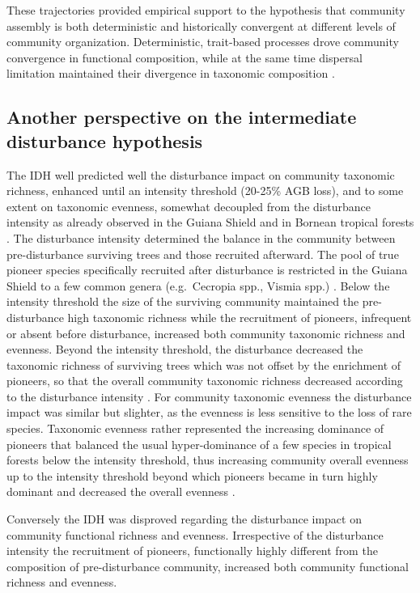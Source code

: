 \documentclass[fleqn,10pt]{ArtEcoFoG} %
\begin{document}
These trajectories provided empirical support to the hypothesis that
community assembly is both deterministic and historically convergent at
different levels of community organization. Deterministic, trait-based
processes drove community convergence in functional composition, while
at the same time dispersal limitation maintained their divergence in
taxonomic composition \citep{Fukami2005}.

\subsection{Another perspective on the intermediate disturbance
hypothesis}\label{another-perspective-on-the-intermediate-disturbance-hypothesis}

The IDH well predicted well the disturbance impact on community
taxonomic richness, enhanced until an intensity threshold (20-25\% AGB
loss), and to some extent on taxonomic evenness, somewhat decoupled from
the disturbance intensity as already observed in the Guiana Shield
\citep{Baraloto2012a} and in Bornean tropical forests
\citep{Cannon1998}. The disturbance intensity determined the balance in
the community between pre-disturbance surviving trees and those
recruited afterward. The pool of true pioneer species specifically
recruited after disturbance is restricted in the Guiana Shield to a few
common genera (e.g.~Cecropia spp., Vismia spp.) \citep{Guitet2018}.
Below the intensity threshold the size of the surviving community
maintained the pre-disturbance high taxonomic richness while the
recruitment of pioneers, infrequent or absent before disturbance,
increased both community taxonomic richness and evenness. Beyond the
intensity threshold, the disturbance decreased the taxonomic richness of
surviving trees which was not offset by the enrichment of pioneers, so
that the overall community taxonomic richness decreased according to the
disturbance intensity \citep{Molino2001}. For community taxonomic
evenness the disturbance impact was similar but slighter, as the
evenness is less sensitive to the loss of rare species. Taxonomic
evenness rather represented the increasing dominance of pioneers that
balanced the usual hyper-dominance of a few species in tropical forests
below the intensity threshold, thus increasing community overall
evenness up to the intensity threshold beyond which pioneers became in
turn highly dominant and decreased the overall evenness
\citep{Baraloto2012a}.

Conversely the IDH was disproved regarding the disturbance impact on
community functional richness and evenness. Irrespective of the
disturbance intensity the recruitment of pioneers, functionally highly
different from the composition of pre-disturbance community, increased
both community functional richness and evenness.
\end{document}

